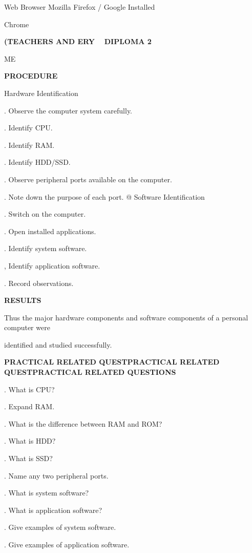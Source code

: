 \documentclass[10pt,a4paper]{article}
\begin{document}
                                                      Web Browser Mozilla Firefox / Google Installed\par

\noindent Chrome\par
\medskip\noindent\textbf{(TEACHERS AND ERY ~ DIPLOMA 2}\par
\noindent ME\par

\medskip\noindent\textbf{PROCEDURE}\par
\noindent Hardware Identification\par
{}. Observe the computer system carefully.\par
{}. Identify CPU.\par
{}. Identify RAM.\par
{}. Identify HDD/SSD.\par
{}. Observe peripheral ports available on the computer.\par
{}. Note down the purpose of each port. @ Software Identification\par
{}. Switch on the computer.\par
{}. Open installed applications.\par
{}. Identify system software.\par
{}, Identify application software.\par
{}. Record observations.\par

\medskip\noindent\textbf{RESULTS}\par
\noindent Thus the major hardware components and software components of a personal computer were\par
\noindent identified and studied successfully.\par
\medskip\noindent\textbf{PRACTICAL RELATED QUESTPRACTICAL RELATED QUESTPRACTICAL RELATED QUESTIONS}\par
{}. What is CPU?\par
{}. Expand RAM.\par
{}. What is the difference between RAM and ROM?\par
{}. What is HDD?\par
{}. What is SSD?\par
{}. Name any two peripheral ports.\par
\clearpage
{}. What is system software?\par
{}. What is application software?\par
{}. Give examples of system software.\par
{}. Give examples of application software.\par
\end{document}
